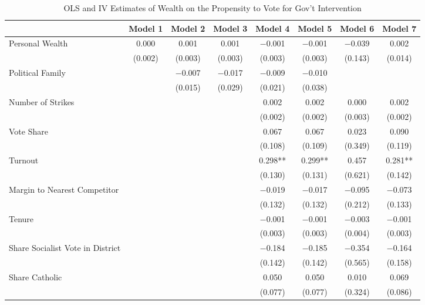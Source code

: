 \begin{table}

\caption{\label{tab:govtint_results}OLS and IV Estimates of Wealth on the Propensity to Vote for Gov't Intervention}
\centering
\begin{tabular}[t]{lccccccc}
\toprule
  & Model 1 & Model 2 & Model 3 & Model 4 & Model 5 & Model 6 & Model 7\\
\midrule
Personal Wealth & \num{0.000} & \num{0.001} & \num{0.001} & \num{-0.001} & \num{-0.001} & \num{-0.039} & \num{0.002}\\
 & (\num{0.002}) & (\num{0.003}) & (\num{0.003}) & (\num{0.003}) & (\num{0.003}) & (\num{0.143}) & (\num{0.014})\\
Political Family &  & \num{-0.007} & \num{-0.017} & \num{-0.009} & \num{-0.010} &  & \\
 &  & (\num{0.015}) & (\num{0.029}) & (\num{0.021}) & (\num{0.038}) &  & \\
Number of Strikes &  &  &  & \num{0.002} & \num{0.002} & \num{0.000} & \num{0.002}\\
 &  &  &  & (\num{0.002}) & (\num{0.002}) & (\num{0.003}) & (\num{0.002})\\
Vote Share &  &  &  & \num{0.067} & \num{0.067} & \num{0.023} & \num{0.090}\\
 &  &  &  & (\num{0.108}) & (\num{0.109}) & (\num{0.349}) & (\num{0.119})\\
Turnout &  &  &  & \num{0.298}** & \num{0.299}** & \num{0.457} & \num{0.281}**\\
 &  &  &  & (\num{0.130}) & (\num{0.131}) & (\num{0.621}) & (\num{0.142})\\
Margin to Nearest Competitor &  &  &  & \num{-0.019} & \num{-0.017} & \num{-0.095} & \num{-0.073}\\
 &  &  &  & (\num{0.132}) & (\num{0.132}) & (\num{0.212}) & (\num{0.133})\\
Tenure &  &  &  & \num{-0.001} & \num{-0.001} & \num{-0.003} & \num{-0.001}\\
 &  &  &  & (\num{0.003}) & (\num{0.003}) & (\num{0.004}) & (\num{0.003})\\
Share Socialist Vote in District &  &  &  & \num{-0.184} & \num{-0.185} & \num{-0.354} & \num{-0.164}\\
 &  &  &  & (\num{0.142}) & (\num{0.142}) & (\num{0.565}) & (\num{0.158})\\
Share Catholic &  &  &  & \num{0.050} & \num{0.050} & \num{0.010} & \num{0.069}\\
 &  &  &  & (\num{0.077}) & (\num{0.077}) & (\num{0.324}) & (\num{0.086})\\

\end{tabular}
\end{table}
